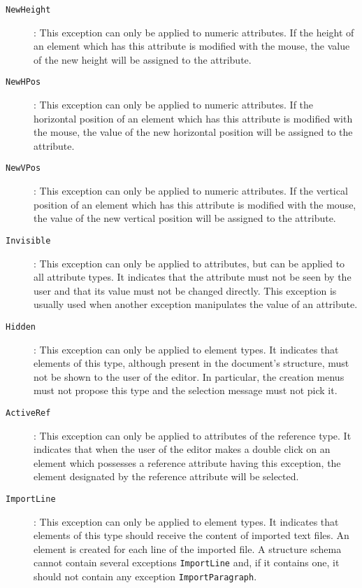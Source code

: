 \begin{description}
\item[{\tt NewHeight}]: This exception can only be applied to numeric
attributes.  If the height of an element which has this attribute is
modified with the mouse, the value of the new height will be assigned
to the attribute.

\item[{\tt NewHPos}]: This exception can only be applied to numeric
attributes.  If the horizontal position of an element which has this
attribute is modified with the mouse, the value of the new horizontal
position will be assigned to the attribute.

\item[{\tt NewVPos}]: This exception can only be applied to numeric
attributes.  If the vertical position of an element which has this
attribute is modified with the mouse, the value of the new vertical
position will be assigned to the attribute.

\item[{\tt Invisible}]:  This exception can only be applied to
attributes, but can be applied to all attribute types.  It indicates
that the attribute must not be seen by the user and that its value
must not be changed directly.  This exception is usually used when
another exception manipulates the value of an attribute.

\item[{\tt Hidden}]:  This exception can only be applied to element
types.  It indicates that elements of this type, although present in
the document's structure, must not be shown to the user of the editor.
In particular, the creation menus must not propose this type and the
selection message must not pick it.

\item[{\tt ActiveRef}]: This exception can only be applied to
attributes of the reference type.  It indicates that when the user of
the editor makes a double click on an element which possesses a
reference attribute having this exception, the element designated by
the reference attribute will be selected.

\item[{\tt ImportLine}]: This exception can only be applied to element
types.  It indicates that elements of this type should receive the
content of imported text files.  An element is created for each line
of the imported file.  A structure schema cannot contain several
exceptions {\tt ImportLine} and, if it contains one, it should not
contain any exception {\tt ImportParagraph}.


\end{description}
